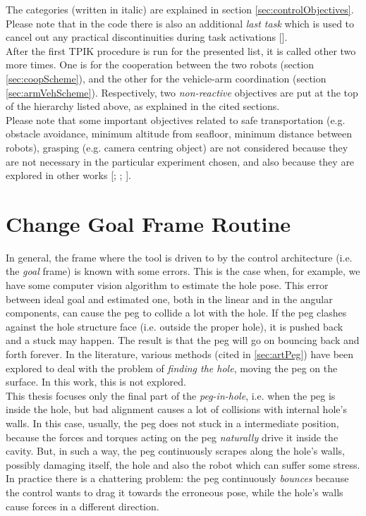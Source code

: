 \noindent The categories (written in italic) are explained in section \ref{sec:controlObjectives}. Please note that in the code there is also an additional \textit{last task} which is used to cancel out any practical discontinuities during task activations [\cite{IntroMaris1}].\\

After the first TPIK procedure is run for the presented list, it is called other two more times. One is for the cooperation between the two robots (section \ref{sec:coopScheme}), and the other for the vehicle-arm coordination (section \ref{sec:armVehScheme}). Respectively, two \textit{non-reactive} objectives are put at the top of the hierarchy listed above, as explained in the cited sections.\\

Please note that some important objectives related to safe transportation (e.g. obstacle avoidance, minimum altitude from seafloor, minimum distance between robots), grasping (e.g. camera centring object) are not considered because they are not necessary in the particular experiment chosen, and also because they are explored in other works [\cite{IntroMaris2}; \cite{tesiWander}; \cite{IntroRecent}].\\


\section{Change Goal Frame Routine}
\label{sec:changeGoal}
In general, the frame where the tool is driven to by the control architecture (i.e. the \textit{goal} frame) is known with some errors. This is the case when, for example, we have some computer vision algorithm to estimate the hole pose. 
This error between ideal goal and estimated one, both in the linear and in the angular components, can cause the peg to collide a lot with the hole. If the peg clashes against the hole structure face (i.e. outside the proper hole), it is pushed back and a stuck may happen. The result is that the peg will go on bouncing back and forth forever. In the literature, various methods (cited in \ref{sec:artPeg}) have been explored to deal with the problem of \textit{finding the hole}, moving the peg on the surface. In this work, this is not explored.\\

This thesis focuses only the final part of the \textit{peg-in-hole}, i.e. when the peg is inside the hole, but bad alignment causes a lot of collisions with internal hole's  walls. In this case, usually, the peg does not stuck in a intermediate position, because the forces and torques acting on the peg \textit{naturally} drive it inside the cavity. But, in such a way, the peg continuously scrapes along the hole's walls, possibly damaging itself, the hole and also the robot which can suffer some stress. In practice there is a chattering problem: the peg continuously \textit{bounces} 
because the control wants to drag it towards the erroneous pose, while the hole's walls cause forces in a different direction.\\

